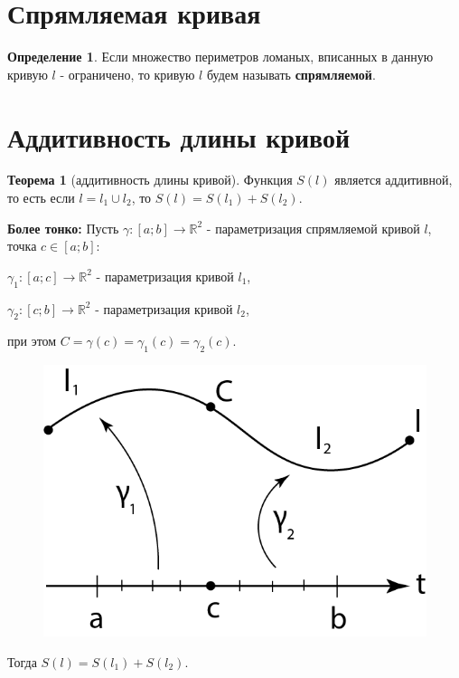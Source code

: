 \documentclass{report}
\theoremstyle{definition}
\newtheorem*{definition}{Определение}
\newtheorem*{theorem}{Теорема}
\begin{document}
\clearpage

\section{Спрямляемая кривая}

\begin{definition}
    Если множество периметров ломаных, вписанных в данную кривую $l$ - ограничено, то кривую $l$
    будем называть \textbf{спрямляемой}.
\end{definition}

\section{Аддитивность длины кривой}

\begin{theorem}[аддитивность длины кривой]
    Функция $S(l)$ является аддитивной, то есть если $l = l_1 \cup l_2$, то $S(l) = S(l_1) + S(l_2)$.

    \textbf{Более тонко:} Пусть $\gamma:[a;b]\rightarrow\mathbb{R}^2$ - параметризация спрямляемой кривой
    $l$, точка $c \in [a;b]$:

    $\gamma_1:[a;c] \rightarrow \mathbb{R}^2$ - параметризация кривой $l_1$,

    $\gamma_2:[c;b] \rightarrow \mathbb{R}^2$ - параметризация кривой $l_2$,

    при этом $C = \gamma(c) = \gamma_1(c) = \gamma_2(c)$.
    \begin{figure}[H]
        \begin{center}
            \includegraphics[scale=0.2]{graph12.png}\label{figure12}
        \end{center}
    \end{figure}

    Тогда $S(l) = S(l_1) + S(l_2)$.
\end{theorem}
\end{document}
